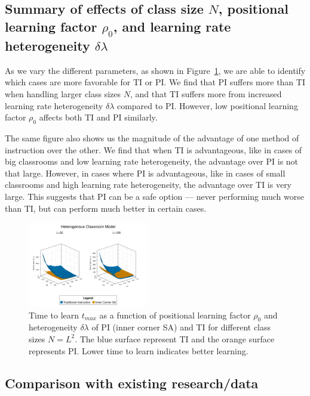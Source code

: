 \documentclass[twocolumn,secnumarabic,amssymb, nobibnotes, aps, prd]{revtex4-2}
\begin{document}
    \subsection{Summary of effects of class size $N$, positional learning factor $\rho_0$, and learning rate heterogeneity $\delta\lambda$}
        
        As we vary the different parameters, as shown in Figure~\ref{fig:Params effect summary t}, we are able to identify which cases are more favorable for TI or PI.
        We find that PI suffers more than TI when handling larger class sizes $N$, and that TI suffers more from increased learning rate heterogeneity $\delta\lambda$ compared to PI.
        However, low positional learning factor $\rho_0$ affects both TI and PI similarly.

        The same figure also shows us the magnitude of the advantage of one method of instruction over the other.
        We find that when TI is advantageous, like in cases of big classrooms and low learning rate heterogeneity, the advantage over PI is not that large.
        However, in cases where PI is advantageous, like in cases of small classrooms and high learning rate heterogeneity, the advantage over TI is very large.
        This suggests that PI can be a safe option --- never performing much worse than TI, but can perform much better in certain cases.

        \begin{figure}[htbp!]
            \centering
            \includegraphics[width=0.47\textwidth]{figures/2D-BPCAIH-analysis/rho-dl-t plots/32-128 comparison.png}
            \caption{Time to learn $t_{max}$ as a function of positional learning factor $\rho_0$ and heterogeneity $\delta\lambda$ of PI (inner corner SA) and TI for different class sizes $N=L^2$.
            The blue surface represent TI and the orange surface represents PI.
            Lower time to learn indicates better learning.}
            \label{fig:Params effect summary t}
        \end{figure}

    \subsection{Comparison with existing research/data}
        
\end{document}
